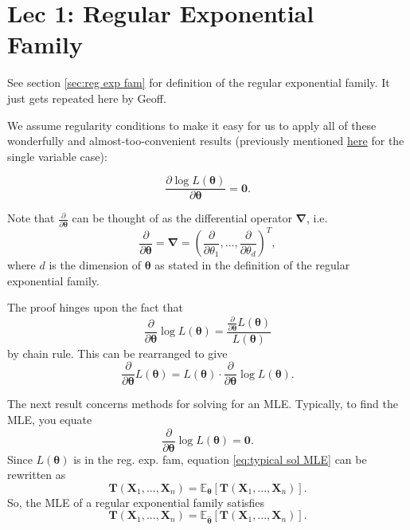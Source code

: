 \chapter[Lec 1: Regular Exponential Family]{Lec 1: Regular Exponential\\ Family}


See section \ref{sec:reg exp fam} for definition of the regular exponential family. 
It just gets repeated here by Geoff.

\bigskip

We assume regularity conditions to make it easy for us to apply all of these wonderfully and almost-too-convenient results (previously mentioned \hyperref[sec:reg conds I]{here} for the single variable case):

\begin{theorem}\label{thm:score stat equals zero} 
    \begin{equation}\label{eq:score stat equals zero}
        \frac{\partial \log L(\bm{\theta})}{\partial \bm{\theta}} = \bm{0}.
    \end{equation}
\end{theorem}

Note that \(\frac{\partial}{\partial \bm{\theta}}\) can be thought of as the differential operator \(\bm{\nabla}\), i.e. 
\[\frac{\partial}{\partial \bm{\theta}} = \bm{\nabla} = \left(\frac{\partial}{\partial \theta_1},...,\frac{\partial}{\partial \theta_d}\right)^T,\]
where \(d\) is the dimension of \(\bm{\theta}\) as stated in the definition of the regular exponential family. 

\bigskip

The proof hinges upon the fact that \[\frac{\partial}{\partial\bm{\theta}} \log{L(\bm{\theta})} = \frac{\frac{\partial}{\partial\bm{\theta}} L(\bm{\theta})}{L(\bm{\theta})} \] by chain rule. 
This can be rearranged to give \[\frac{\partial}{\partial\bm{\theta}} L(\bm{\theta}) = L(\bm{\theta}) \cdot \frac{\partial}{\partial\bm{\theta}} \log{L(\bm{\theta})}.\] 

\bigskip

The next result concerns methods for solving for an MLE. Typically, to find the MLE, you equate 
\begin{equation}\label{eq:typical sol MLE}
    \frac{\partial}{\partial\bm{\theta}} \log{L(\bm{\theta})} = \bm{0}.
\end{equation}
Since \(L(\bm{\theta})\) is in the reg. exp. fam, equation \ref{eq:typical sol MLE} can be rewritten as
\begin{equation}\label{eq:reg exp MLE stuff 1}
    \bm{T}(\bm{X}_1,...,\bm{X}_n) = \mathbb{E}_{\bm{\theta}} [\bm{T}(\bm{X}_1,...,\bm{X}_n)].
\end{equation}
So, the MLE of a regular exponential family satisfies
\begin{equation}\label{eq:reg exp MLE stuff 2}
    \bm{T}(\bm{X}_1,...,\bm{X}_n) = \mathbb{E}_{\hat{\bm{\theta}}} [\bm{T}(\bm{X}_1,...,\bm{X}_n)].
\end{equation}

